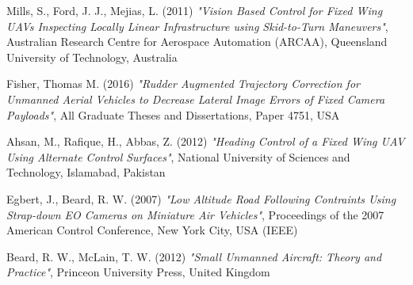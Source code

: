 \begin{thebibliography}{25}
	Mills, S., Ford, J. J., Mejias, L. (2011)
	\emph{"Vision Based Control for Fixed Wing UAVs Inspecting Locally Linear Infrastructure using Skid-to-Turn Maneuvers"}, 
	Australian Research Centre for Aerospace Automation (ARCAA), Queensland University of Technology, Australia
	
	Fisher, Thomas M. (2016)
	\emph{"Rudder Augmented Trajectory Correction for Unmanned Aerial Vehicles to Decrease Lateral Image Errors of Fixed Camera Payloads"},
	All Graduate Theses and Dissertations, Paper 4751, USA
	
	Ahsan, M., Rafique, H., Abbas, Z. (2012)
	\emph{"Heading Control of a Fixed Wing UAV Using Alternate Control Surfaces"},
	National University of Sciences and Technology, Islamabad, Pakistan
	
	Egbert, J., Beard, R. W. (2007)
	\emph{"Low Altitude Road Following Contraints Using Strap-down EO Cameras on Miniature Air Vehicles"},
	Proceedings of the 2007 American Control Conference, New York City, USA (IEEE)
	
	Beard, R. W., McLain, T. W. (2012)
	\emph{"Small Unmanned Aircraft: Theory and Practice"},
	Princeon University Press, United Kingdom
	
\end{thebibliography}